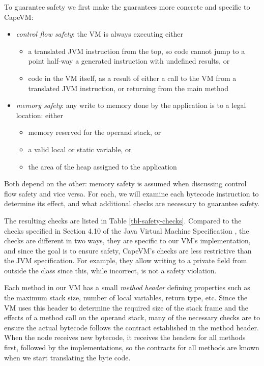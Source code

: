To guarantee safety we first make the guarantees more concrete and specific to CapeVM:

\begin{itemize}
	\item \emph{control flow safety}: the VM is always executing either
		\begin{itemize}
			\item a translated JVM instruction from the top, so code cannot jump to a point half-way a generated instruction with undefined results, or
			\item code in the VM itself, as a result of either a call to the VM from a translated JVM instruction, or returning from the main method
		\end{itemize}
	\item \emph{memory safety}: any write to memory done by the application is to a legal location: either
		\begin{itemize}
			\item memory reserved for the operand stack, or
			\item a valid local or static variable, or
			\item the area of the heap assigned to the application
		\end{itemize}
\end{itemize}

Both depend on the other: memory safety is assumed when discussing control flow safety and vice versa. For each, we will examine each bytecode instruction to determine its effect, and what additional checks are necessary to guarantee safety.

The resulting checks are listed in Table \ref{tbl-safety-checks}. Compared to the checks specified in Section 4.10 of the Java Virtual Machine Specification \cite{Lindholm:2017vu}, the checks are different in two ways, they are specific to our VM's implementation, and since the goal is to ensure safety, CapeVM's checks are less restrictive than the JVM specification. For example, they allow writing to a private field from outside the class since this, while incorrect, is not a safety violation. 

Each method in our VM has a small \emph{method header} defining properties such as the maximum stack size, number of local variables, return type, etc. Since the VM uses this header to determine the required size of the stack frame and the effects of a method call on the operand stack, many of the necessary checks are to ensure the actual bytecode follows the contract established in the method header. When the node receives new bytecode, it receives the headers for all methods first, followed by the implementations, so the contracts for all methods are known when we start translating the byte code.

